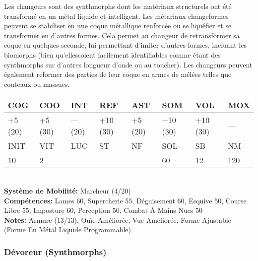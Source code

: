 Les changeurs sont des synthmorphs dont les matériaux structurels ont été transformé en un métal liquide et intelligent. Les métariaux changeformes peuvent se stabiliser en une coque métallique renforcée ou se liquéfier et se transformer en d'autres formes. Cela permet au changeur de retransformer sa coque en quelques seconde, lui permettant d'imiter d'autres formes, incluant les biomorphs (bien qu'ellessoient facilement identifiables comme étant des synthmorphs sur d'autres longueur d'onde ou au toucher). Les changeurs peuvent également reformer des parties de leur coque en armes de mélées telles que couteaux ou massues. \\ \begin{tabular}{|l|l|l|l|l|l|l|l|} \hline

COG &COO &INT &REF &AST &SOM &VOL &MOX \\ \hline

+5 (20) &+5 (30) &— (20) &+10 (30) &+5 (20) &+10 (30) &+10 (30) &— \\ \hline

INIT &VIT &LUC &ST &NF &SOL &SB &NM \\ \hline

10 &2 &— &— &— &60 &12 &120 \\ \hline

\end{tabular} \\ \textbf{Système de Mobilité: }Marcheur (4/20) \\ \textbf{Compétences:} Lames 60, Supercherie 55, Déguisement 60, Esquive 50, Course Libre 55, Imposture 60, Perception 50, Combat À Mains Nues 50 \\ \textbf{Notes: }Armure (13/13), Ouïe Améliorée, Vue Améliorée, Forme Ajustable (Forme En Métal Liquide Programmable) 

\subsubsection{Dévoreur (Synthmorphs)} 

